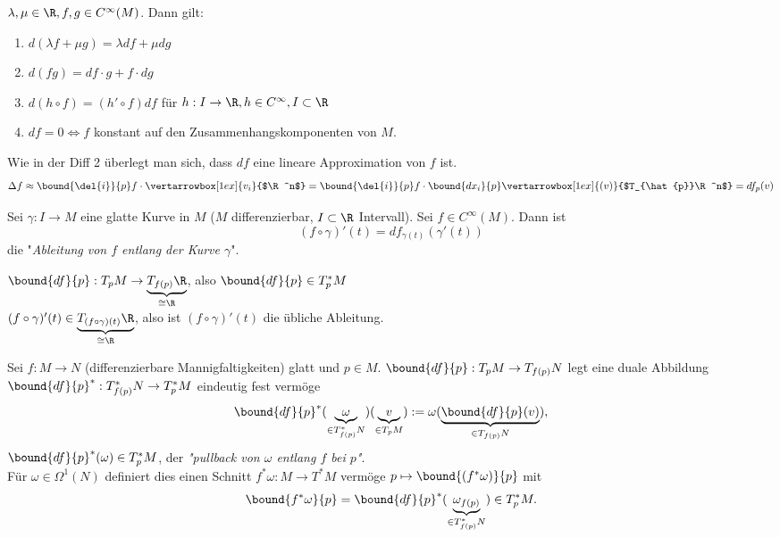 \begin{rem*}\lecture
	$ \lambda,\mu \in \R, f,g \in C^\infty(M) $. Dann gilt:
	\begin{enumerate}[label={\roman*})]
		\item $ d(\lambda f + \mu g)= \lambda df + \mu dg $
		\item $ d(fg) = df \cdot g + f \cdot dg $
		\item $ d(h \circ f) = (h' \circ f)df $ für $ h: I \to \R, h \in C^\infty, I \subset \R $
		\item $ df=0 \iff f $ konstant auf den Zusammenhangskomponenten von $M$.
	\end{enumerate}
\end{rem*}

\begin{rem*}
	Wie in der Diff 2 überlegt man sich, dass $df$ eine lineare Approximation von $f$ ist.
	\[ \Delta f \approx \bound{\del{i}}{p} f \cdot \vertarrowbox[1ex]{v_i}{$\R^n$} = \bound{\del{i}}{p} f \cdot \bound{dx_i}{p} \vertarrowbox[1ex]{(v)}{$T_{\hat{p}}\R^n$} = df_p(v) \]
\end{rem*}

\begin{defn}
	Sei $ \gamma: I \to M $ eine glatte Kurve in $M$ ($M$ differenzierbar, $I \subset \R$ Intervall). Sei $f \in C^\infty(M)$. Dann ist
	\[ (f \circ \gamma)'(t) = df_{\gamma(t)}(\gamma'(t)) \]
	die "\emph{Ableitung von $f$ entlang der Kurve $\gamma$}".
\end{defn}

\begin{rem*}
	$ \bound{df}{p}: T_pM \to \underbrace{T_{f(p)}\R}_{\cong \R} $, also $ \bound{df}{p} \in T_p^*M $\\
	$ (f \circ \gamma)'(t) \in \underbrace{T_{(f \circ \gamma) (t)}\R}_{\cong \R} $, also ist $(f \circ \gamma)'(t)$ die übliche Ableitung.
\end{rem*}

\begin{defn}[Pullback]
	Sei $ f: M \to N $ (differenzierbare Mannigfaltigkeiten) glatt und $p \in M$. $ \bound{df}{p}: T_pM \to T_{f(p)}N $ legt eine duale Abbildung $ \bound{df}{p}^*: T_{f(p)}^*N \to T_p^*M $ eindeutig fest vermöge
	\[ \bound{df}{p}^*(\underbrace{\omega}_{\in T_{f(p)}^*N})(\underbrace{v}_{\in T_pM}) := \omega(\underbrace{\bound{df}{p}(v)}_{\in T_{f(p)}N}), \]
	$ \bound{df}{p}^* (\omega) \in T_p^*M $, der \emph{"pullback von $\omega$ entlang $f$ bei $p$"}.\\
	Für $\omega \in \Omega^1(N)$ definiert dies einen Schnitt $ f^*\omega: M \to T^*M $ vermöge $ p \mapsto \bound{(f^*\omega)}{p} $ mit
	\[ \bound{f^*\omega}{p} = \bound{df}{p}^* (\underbrace{\omega_{f(p)}}_{\in T_{f(p)}^*N}) \in T_p^*M. \]
\end{defn}

